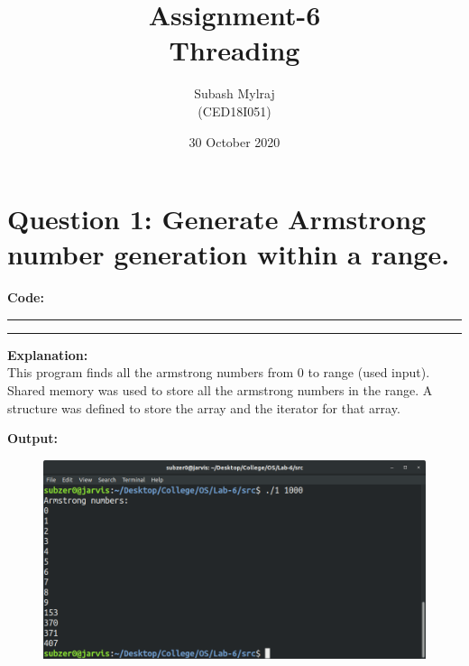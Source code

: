 \documentclass{article}
\title{Assignment-6\\Threading}
\author{Subash Mylraj \\(CED18I051) }
\date{30 October 2020}
\begin{document}
\maketitle



\section*{Question 1: Generate Armstrong number generation within a range.}
\bigskip

\par\noindent
\textbf{\Large Code: }
\smallskip
\par\noindent\rule{\textwidth}{0.4pt}

\par\noindent\rule{\textwidth}{0.4pt}

\bigskip
\noindent
\textbf{\Large Explanation: } \\

This program finds all the armstrong numbers from 0 to range (used input). 
Shared memory was used to store all the armstrong numbers in the range. A
structure was defined to store the array and the iterator for that array.

\bigskip
\noindent
\textbf{\Large Output:}

\begin{figure}[h]
	\includegraphics[width=\textwidth]{output/1.png}
\end{figure}
\bigskip
\end{document}
